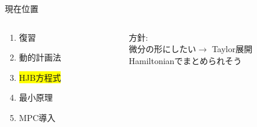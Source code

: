 \documentclass[dvipdfmx,12pt]{beamer}
\begin{document}
    \begin{frame}{現在位置}
        \footnotesize
        \begin{columns}
            \begin{column}{.35\textwidth}
                \begin{enumerate}
                    \item 復習
                    \item 動的計画法
                    \item \colorbox{yellow}{HJB方程式}
                    \item 最小原理
                    \item MPC導入
                \end{enumerate}
            \end{column}
    
            \begin{column}{.7\textwidth}
               
                \begin{screen}
                    
                    {\fontsize{7.5pt}{6pt}\selectfont
                    \begin{center}
                    \end{center}
                    }
                \end{screen}
                方針:\\
                \qquad 微分の形にしたい$\rightarrow$ Taylor展開\\
                \qquad Hamiltonianでまとめられそう\\
            \end{column}
        \end{columns}
    \end{frame}
\end{document}
